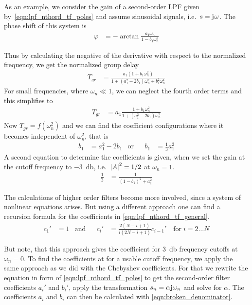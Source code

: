 As an example, we consider the gain of a second-order \ac{LPF} given by~\eqref{eqn:lpf_nthord_tf_poles} and assume sinusoidal signals, i.e.\ $s=\mathrm{j}\mkern1mu\omega$. The phase shift of this system is
\begin{align}
  \varphi &= -\arctan\frac{a_1\omega_n}{1-b_1\omega_n^2}
\end{align}

Thus by calculating the negative of the derivative with respect to the normalized frequency, we get the normalized group delay
\begin{align}
  T_{gr} &= \frac{a_1(1+b_1\omega_n^2)}{1+(a_1^2-2b_1)\omega_n^2+b_1^2\omega_n^4}
\end{align}
For small frequencies, where $\omega_n\ll 1$, we can neglect the fourth order terms and this simplifies to
\begin{align}
  T_{gr} &= a_1\frac{1+b_1\omega_n^2}{1+(a_1^2-2b_1)\omega_n^2}
\end{align}
Now $T_{gr}=f(\omega_n^2)$ and we can find the coefficient configurations where it becomes independent of $\omega_n^2$, that is
\begin{align}
  &&b_1 &= a_1^2-2b_1 &\text{or}& &b_1 &= \frac{1}{3}a_1^2&&
\end{align}
A second equation to determine the coefficients is given, when we set the gain at the cutoff frequency to \SI{-3}{\decibel}, i.e.\ $\abs{A}^2=1/2$ at $\omega_n=1$.
\begin{align}
  \frac{1}{2} &= \frac{1}{(1-b_1)^2+a_1^2}
\end{align}

The calculations of higher order filters become more involved, since a system of nonlinear equations arises. But using a different approach one can find a recursion formula for the coefficients in \eqref{eqn:lpf_nthord_tf_general}.
\begin{align}
  &&c_1' &= 1 &\text{and}&  &c_i' &= \frac{2(N-i+1)}{i(2N-i+1)}c_{i-1}'\quad\text{for}\;i=2\dots N&&
\end{align}

But note, that this approach gives the coefficient for \SI{3}{\decibel} frequency cutoffs at $\omega_n=0$. To find the coefficients at for a usable cutoff frequency, we apply the same approach as we did with the Chebyshev coefficients. For that we rewrite the equation in form of \eqref{eqn:lpf_nthord_tf_poles} to get the second-order filter coefficients $a_i'$ and $b_i'$, apply the transformation $s_n=\alpha\mathrm{j}\mkern1mu\omega_n$ and solve for $\alpha$. The coefficients $a_i$ and $b_i$ can then be calculated with \eqref{eqn:broken_denominator}.

